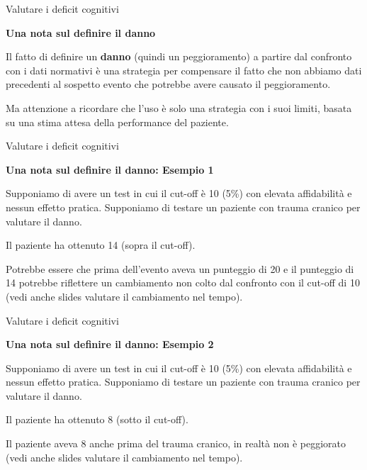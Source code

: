 \documentclass[
  ignorenonframetext,
]{beamer}
\begin{document}
\begin{frame}{Valutare i deficit cognitivi}
\label{valutare-i-deficit-cognitivi-30}
\begin{center}
  \textbf{Una nota sul definire il danno}
\end{center}
\vspace{2em}

Il fatto di definire un \textbf{danno} (quindi un peggioramento) a
partire dal confronto con i dati normativi è una strategia per
compensare il fatto che non abbiamo dati precedenti al sospetto evento
che potrebbe avere causato il peggioramento.

Ma attenzione a ricordare che l'uso è solo una strategia con i suoi
limiti, basata su una stima attesa della performance del paziente.
\end{frame}

\begin{frame}{Valutare i deficit cognitivi}
\label{valutare-i-deficit-cognitivi-31}
\begin{center}
  \textbf{Una nota sul definire il danno: Esempio 1}
\end{center}
\vspace{2em}

Supponiamo di avere un test in cui il cut-off è 10 (5\%) con elevata
affidabilità e nessun effetto pratica. Supponiamo di testare un paziente
con trauma cranico per valutare il danno.

Il paziente ha ottenuto 14 (sopra il cut-off).

Potrebbe essere che prima dell'evento aveva un punteggio di 20 e il
punteggio di 14 potrebbe riflettere un cambiamento non colto dal
confronto con il cut-off di 10 (vedi anche slides valutare il
cambiamento nel tempo).
\end{frame}

\begin{frame}{Valutare i deficit cognitivi}
\label{valutare-i-deficit-cognitivi-32}
\begin{center}
  \textbf{Una nota sul definire il danno: Esempio 2}
\end{center}
\vspace{2em}

Supponiamo di avere un test in cui il cut-off è 10 (5\%) con elevata
affidabilità e nessun effetto pratica. Supponiamo di testare un paziente
con trauma cranico per valutare il danno.

Il paziente ha ottenuto 8 (sotto il cut-off).

Il paziente aveva 8 anche prima del trauma cranico, in realtà non è
peggiorato (vedi anche slides valutare il cambiamento nel tempo).
\end{frame}
\end{document}
